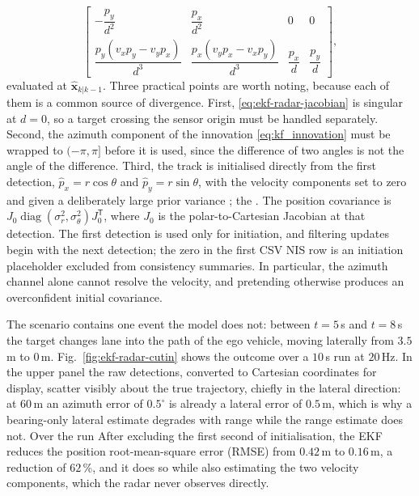 \documentclass[graybox,envcountchap]{style/SNmono}
\DeclareMathOperator{\diag}{diag}
\providecommand{\DIFadd}[1]{{\protect\color{blue} #1}} %
\providecommand{\DIFdel}[1]{{\protect\color{red} #1}} %
\providecommand{\DIFaddbegin}{} %
\providecommand{\DIFaddend}{} %
\providecommand{\DIFdelbegin}{} %
\providecommand{\DIFdelend}{} %
\begin{document}
\begin{example}
\begin{equation}
\begin{bmatrix}
-\dfrac{p_y}{d^{2}} & \dfrac{p_x}{d^{2}} & 0 & 0\\[8pt]
\dfrac{p_y(v_xp_y-v_yp_x)}{d^{3}} &
\dfrac{p_x(v_yp_x-v_xp_y)}{d^{3}} &
\dfrac{p_x}{d} & \dfrac{p_y}{d}
\end{bmatrix},
\label{eq:ekf-radar-jacobian}
\end{equation}
evaluated at $\widehat{\mathbf{x}}_{k|k-1}$. Three practical points are worth
noting, because each of them is a common source of divergence. First,
\eqref{eq:ekf-radar-jacobian} is singular at $d=0$, so a target crossing the
sensor origin must be handled separately. Second, the azimuth component of the
innovation \eqref{eq:kf_innovation} must be wrapped to $(-\pi,\pi]$ before it is
used, since the difference of two angles is not the angle of the difference.
Third, the track is initialised directly from the first detection,
$\widehat{p}_x=r\cos\theta$ and $\widehat{p}_y=r\sin\theta$, with the velocity components set to zero and given a deliberately large prior variance\DIFdelbegin \DIFdel{; the
}\DIFdelend \DIFaddbegin \DIFadd{. The position covariance is $J_0\diag(\sigma_r^2,\sigma_\theta^2)J_0^{\mathsf T}$, where $J_0$ is the polar-to-Cartesian Jacobian at that detection. The first detection is used only for initiation, and filtering updates begin with the next detection; the zero in the first CSV NIS row is an initiation placeholder excluded from consistency summaries. In particular, the
}\DIFaddend azimuth channel alone cannot resolve the velocity, and pretending otherwise
produces an overconfident initial covariance.

The scenario contains one event the model does not: between $t=5$\,s and
$t=8$\,s the target changes lane into the path of the ego vehicle, moving
laterally from $3.5$\,m to $0$\,m. Fig.~\ref{fig:ekf-radar-cutin} shows the
outcome over a $10$\,s run at $20$\,Hz. In the upper panel the raw detections,
converted to Cartesian coordinates for display, scatter visibly about the true
trajectory, chiefly in the lateral direction: at $60$\,m an azimuth error of
$0.5^{\circ}$ is already a lateral error of $0.5$\,m, which is why a bearing-only
lateral estimate degrades with range while the range estimate does not. \DIFdelbegin \DIFdel{Over the run }\DIFdelend \DIFaddbegin \DIFadd{After excluding the first second of initialisation, }\DIFaddend the EKF reduces the position root-mean-square error (RMSE) from $0.42$\,m to $0.16$\,m, a reduction of
$62$\,\%, and it does so while also estimating the two velocity components, which
the radar never observes directly.


\end{example}
\end{document}
